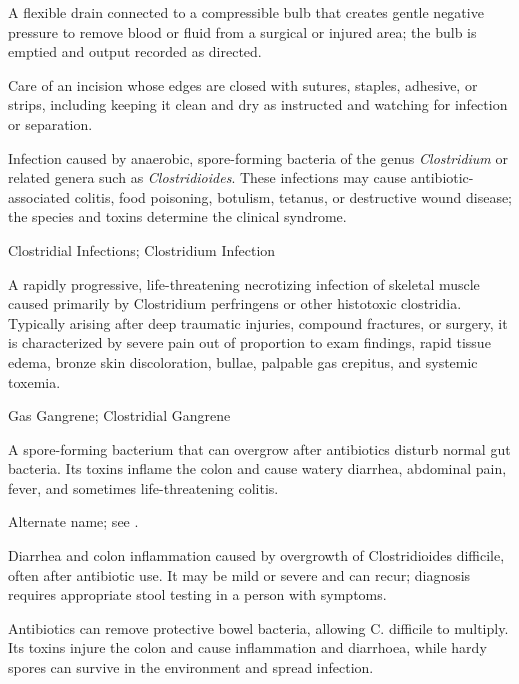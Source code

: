  A flexible drain connected to a compressible bulb that creates gentle negative pressure to remove blood or fluid from a surgical or injured area; the bulb is emptied and output recorded as directed.

 Care of an incision whose edges are closed with sutures, staples, adhesive, or strips, including keeping it clean and dry as instructed and watching for infection or separation.

 Infection caused by anaerobic, spore-forming
bacteria of the genus \textit{Clostridium} or related genera such as
\textit{Clostridioides}. These infections may cause antibiotic-associated
colitis, food poisoning, botulism, tetanus, or destructive wound disease; the
species and toxins determine the clinical syndrome.

\synonyms
Clostridial Infections; Clostridium Infection

 A rapidly progressive, life-threatening necrotizing infection of skeletal muscle caused primarily by Clostridium perfringens or other histotoxic clostridia. Typically arising after deep traumatic injuries, compound fractures, or surgery, it is characterized by severe pain out of proportion to exam findings, rapid tissue edema, bronze skin discoloration, bullae, palpable gas crepitus, and systemic toxemia.

\synonyms
Gas Gangrene; Clostridial Gangrene

 A spore-forming bacterium that can overgrow after antibiotics disturb normal gut bacteria. Its toxins inflame the colon and cause watery diarrhea, abdominal pain, fever, and sometimes life-threatening colitis.

 Alternate name; see .

 Diarrhea and colon inflammation caused by overgrowth of Clostridioides difficile, often after antibiotic use. It may be mild or severe and can recur; diagnosis requires appropriate stool testing in a person with symptoms.

 Antibiotics can remove protective bowel bacteria, allowing C. difficile to multiply. Its toxins injure the colon and cause inflammation and diarrhoea, while hardy spores can survive in the environment and spread infection.

